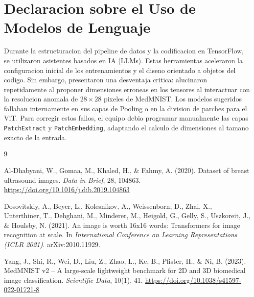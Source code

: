 \documentclass[12pt, a4paper]{article}
\begin{document}
\section{Declaracion sobre el Uso de Modelos de Lenguaje}

Durante la estructuracion del pipeline de datos y la codificacion en TensorFlow, se utilizaron asistentes basados en IA (LLMs). Estas herramientas aceleraron la configuracion inicial de los entrenamientos y el diseno orientado a objetos del codigo. Sin embargo, presentaron una desventaja critica: alucinaron repetidamente al proponer dimensiones erroneas en los tensores al interactuar con la resolucion anomala de $28\times28$ pixeles de MedMNIST. Los modelos sugeridos fallaban internamente en sus capas de Pooling o en la division de parches para el ViT. Para corregir estos fallos, el equipo debio programar manualmente las capas \texttt{PatchExtract} y \texttt{PatchEmbedding}, adaptando el calculo de dimensiones al tamano exacto de la entrada.

\newpage

\begin{thebibliography}{9}

Al-Dhabyani, W., Gomaa, M., Khaled, H., \& Fahmy, A. (2020).
\newblock Dataset of breast ultrasound images.
\newblock \textit{Data in Brief}, 28, 104863.
\newblock \url{https://doi.org/10.1016/j.dib.2019.104863}

Dosovitskiy, A., Beyer, L., Kolesnikov, A., Weissenborn, D., Zhai, X., Unterthiner, T., Dehghani, M., Minderer, M., Heigold, G., Gelly, S., Uszkoreit, J., \& Houlsby, N. (2021).
\newblock An image is worth 16x16 words: Transformers for image recognition at scale.
\newblock In \textit{International Conference on Learning Representations (ICLR 2021)}.
\newblock arXiv:2010.11929.

Yang, J., Shi, R., Wei, D., Liu, Z., Zhao, L., Ke, B., Pfister, H., \& Ni, B. (2023).
\newblock MedMNIST v2 -- A large-scale lightweight benchmark for 2D and 3D biomedical image classification.
\newblock \textit{Scientific Data}, 10(1), 41.
\newblock \url{https://doi.org/10.1038/s41597-022-01721-8}

\end{thebibliography}
\end{document}
